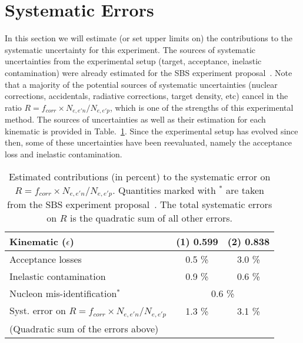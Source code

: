 \section{Systematic Errors}

In this section we will estimate (or set upper limits on) the contributions to the systematic uncertainty for this experiment.
The sources of systematic uncertainties from the experimental setup (target, acceptance, inelastic contamination) were already estimated for the SBS \gmn experiment proposal~\cite{E12-09-019}.
Note that a majority of the potential sources of systematic uncertainties (nuclear corrections, accidentals, radiative corrections, target density, etc) cancel in the ratio $R = f_{corr} \times N_{e,e'n}/N_{e,e'p}$, which is one of the strengths of this experimental method.
The sources of uncertainties as well as their estimation for each kinematic is provided in Table.~\ref{r_systematic_summary}.
Since the experimental setup has evolved since then, some of these uncertainties have been reevaluated, namely the acceptance loss and inelastic contamination.
%
\begin{table}[!h]
\begin{center}
\caption{
  Estimated contributions (in percent) to the systematic error on $R = f_{corr} \times N_{e,e'n}/N_{e,e'p}$.  
  Quantities marked with $^*$ are taken from the SBS \gmn experiment proposal~\cite{E12-09-019}.
  The total systematic errors on $R$ is the quadratic sum of all other errors.
}
\label{r_systematic_summary}
\vspace{.2in}
{\begin{tabular}{|l|c|c|}
\hline
\hline
 Kinematic ($\epsilon$) & (1) 0.599 & (2) 0.838\\
\hline
Acceptance losses & 0.5 \% & 3.0 \% \\
\hline
Inelastic contamination & 0.9 \% & 0.6 \% \\
\hline
Nucleon mis-identification$^*$ & \multicolumn{2}{|c|}{0.6 \% } \\
\hline
\hline
Syst. error on $R = f_{corr} \times N_{e,e'n}/N_{e,e'p}$ & 1.3 \%  & 3.1 \%  \\
(Quadratic sum of the errors above) & & \\
\hline
\hline
\end{tabular}}
\end{center}
\end{table}
